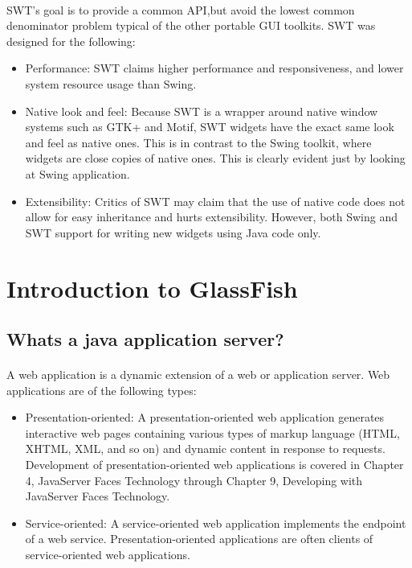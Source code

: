 \documentclass[12pt,a4paper]{report}
\begin{document}
\paragraph{}
SWT's goal is to provide a common API,but avoid the lowest common denominator problem typical of the other portable GUI toolkits. SWT was designed for the following:
\begin{itemize}
\item Performance: SWT claims higher performance and responsiveness, and lower system resource usage than Swing.

\item Native look and feel: Because SWT is a wrapper around native window systems such as GTK+ and Motif, SWT widgets have the exact same look and feel as native ones. This is in contrast to the Swing toolkit, where
widgets are close copies of native ones. This is clearly evident just by looking at Swing application.

\item Extensibility: Critics of SWT may claim that the use of native code does not allow for easy inheritance and hurts extensibility. However, both Swing and SWT support for writing new widgets using Java code only.
\end{itemize}

\section{Introduction to GlassFish}

\subsection{Whats a java application server?}
\paragraph{}
A web application is a dynamic extension of a web or application server. Web applications are of the following types:
\begin{itemize}
\item Presentation-oriented: A presentation-oriented web application generates interactive web pages containing various types of 
markup language (HTML, XHTML, XML, and so on) and dynamic content in response to requests. Development of presentation-oriented web 
applications is covered in Chapter 4, JavaServer Faces Technology through Chapter 9, Developing with JavaServer Faces Technology.

\item Service-oriented: A service-oriented web application implements the endpoint of a web service. Presentation-oriented applications
are often clients of service-oriented web applications. 
\end{itemize}
\end{document}
